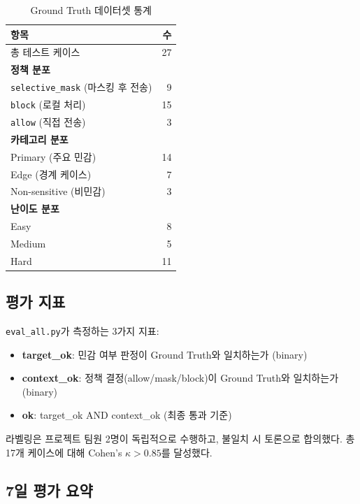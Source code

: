 \documentclass[11pt,a4paper]{article}
\begin{document}
\begin{table}[h]
\centering
\begin{tabular}{@{}lr@{}}
\toprule
항목 & 수 \\
\midrule
총 테스트 케이스 & 27 \\
\midrule
\multicolumn{2}{l}{\textbf{정책 분포}} \\
\quad \texttt{selective\_mask} (마스킹 후 전송) & 9 \\
\quad \texttt{block} (로컬 처리) & 15 \\
\quad \texttt{allow} (직접 전송) & 3 \\
\midrule
\multicolumn{2}{l}{\textbf{카테고리 분포}} \\
\quad Primary (주요 민감) & 14 \\
\quad Edge (경계 케이스) & 7 \\
\quad Non-sensitive (비민감) & 3 \\
\midrule
\multicolumn{2}{l}{\textbf{난이도 분포}} \\
\quad Easy & 8 \\
\quad Medium & 5 \\
\quad Hard & 11 \\
\bottomrule
\end{tabular}
\caption{Ground Truth 데이터셋 통계}
\end{table}

\subsection{평가 지표}

\texttt{eval\_all.py}가 측정하는 3가지 지표:

\begin{itemize}[nosep]
  \item \textbf{target\_ok}: 민감 여부 판정이 Ground Truth와 일치하는가 (binary)
  \item \textbf{context\_ok}: 정책 결정(allow/mask/block)이 Ground Truth와 일치하는가 (binary)
  \item \textbf{ok}: target\_ok AND context\_ok (최종 통과 기준)
\end{itemize}

라벨링은 프로젝트 팀원 2명이 독립적으로 수행하고, 불일치 시 토론으로 합의했다. 총 17개 케이스에 대해 Cohen's $\kappa > 0.85$를 달성했다.

\subsection{7일 평가 요약}
\end{document}
